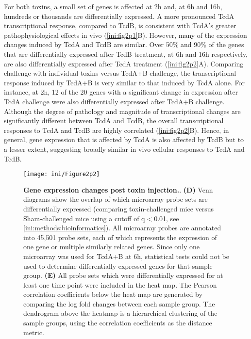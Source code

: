 For both toxins, a small set of genes is affected at 2h and, at 6h 
and 16h, hundreds or thousands are differentially expressed. A more 
pronounced TcdA transcriptional response, compared to TcdB, is 
consistent with TcdA's greater pathophysiological effects in vivo 
(\autoref{ini:fig2p1}B). However, many of the expression changes 
induced by TcdA and TcdB are similar. Over 50\% and 90\% of the 
genes that are differentially expressed after TcdB treatment, at 
6h and 16h respectively, are also differentially expressed after 
TcdA treatment (\autoref{ini:fig2p2}A). Comparing challenge with 
individual toxins versus TcdA+B challenge, the transcriptional 
response induced by TcdA+B is very similar to that induced by TcdA 
alone. For instance, at 2h, 12 of the 20 genes with a significant 
change in expression after TcdA challenge were also differentially 
expressed after TcdA+B challenge. Although the degree of pathology 
and magnitude of transcriptional changes are significantly 
different between TcdA and TcdB, the overall transcriptional 
responses to TcdA and TcdB are highly correlated (\autoref{ini:fig2p2}B). 
Hence, in general, gene expression that is affected by TcdA is also 
affected by TcdB but to a lesser extent, suggesting broadly similar 
in vivo cellular responses to TcdA and TcdB.

\begin{SCfigure}
  \centering
  \texttt{[image: ini/Figure2p2]}
  \caption[Gene expression changes post toxin injection]{
       \textbf{Gene expression changes post toxin injection.}.
       \textbf{(D)} Venn diagrams show the overlap of which microarray 
       probe sets are differentially expressed (comparing toxin-challenged 
       mice versus Sham-challenged mice using a cutoff of q$<$0.01, see 
       \ref{ini:methods:bioinformatics}). All microarray probes are 
       annotated into 45,501 probe sets, each of which represents 
       the expression of one gene or multiple similarly related 
       genes. Since only one microarray was used for TcdA+B at 6h, 
       statistical tests could not be used to determine differentially 
       expressed genes for that sample group. \textbf{(E)} All probe 
       sets which were differentially expressed for at least one 
       time point were included in the heat map. The Pearson correlation 
       coefficients below the heat map are generated by comparing the 
       log fold changes between each sample group. The dendrogram above 
       the heatmap is a hierarchical clustering of the sample groups, 
       using the correlation coefficients as the distance metric.    
  }
  \label{ini:fig2p2}
\end{SCfigure}

